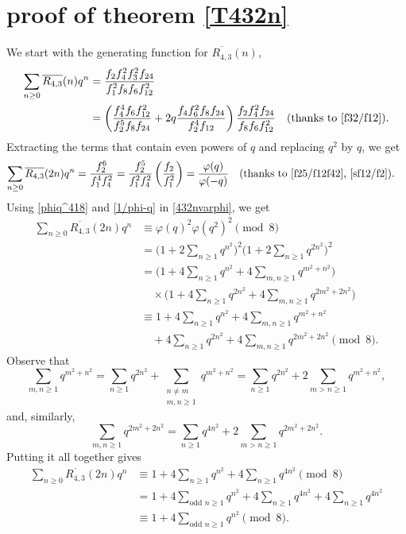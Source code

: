 \documentclass{amsart}
\theoremstyle{definition}
\begin{document}
\section{proof of theorem \ref{T432n}}
We start with the generating function for $\overline{R_{4,3}}(n)$,
\begin{align*}
\sum_{n\geq 0}\overline{R_{4,3}}(n)q^n&=\frac{f_2f_4^2f_3^2f_{24}}{f_1^2f_{8}f_{6}f_{12}^2}\\
&=\left(\frac{f_4^4f_6f_{12}^2}{f_2^5f_8f_{24}}+2q\frac{f_4f_6^2f_8f_{24}}{f_2^4f_{12}}\right)\frac{f_2f_4^2f_{24}}{f_{8}f_{6}f_{12}^2} \quad \text{(thanks to \eqref{f32/f12})}.
\end{align*}
Extracting the terms that contain even powers of $q$ and replacing $q^2$ by $q$, we get
\begin{align}
 \label{432nvarphi} \sum_{n\geq 0}\overline{R_{4,3}}(2n)q^n&=\frac{f_2^6}{f_1^4f_4^2}=\frac{f_2^5}{f_1^2f_4^2}\left(\frac{f_2}{f_1^2}\right)=\frac{\varphi(q)}{\varphi(-q)} \quad \text{(thanks to \eqref{f25/f12f42}, \eqref{sf12/f2})}.
 \end{align}
Using \eqref{phiq^418} and \eqref{1/phi-q} in \eqref{432nvarphi}, we get
 \begin{align*}
  \sum_{n\geq 0}\overline{R_{4,3}}(2n)q^n&\equiv \varphi(q)^2\varphi(q^2)^2\pmod{8} \quad\\
&=\Big(1+2\sum_{n\geq1}q^{n^2}\Big)^2\Big(1+2\sum_{n\geq1}q^{2n^2}\Big)^2\\
&=\Big(1+4\sum_{n\geq1}q^{n^2}+4\sum_{m,n\geq1}q^{m^2+n^2}\Big)\\
&\quad\times\Big(1+4\sum_{n\geq1}q^{2n^2}+4\sum_{m,n\geq1}q^{2m^2+2n^2}\Big)\\
   &\equiv 1+4\sum_{n\geq1}q^{n^2}+4\sum_{m,n\geq1}q^{m^2+n^2}\\
   &\quad+4\sum_{n\geq1}q^{2n^2}+4\sum_{m,n\geq1}q^{2m^2+2n^2}\pmod{8}.\end{align*}
Observe that 
$$
\sum_{m,n\geq1}q^{m^2+n^2}=\sum_{n\geq1}q^{2n^2}+\sum_{\substack{n\neq m\\m,n\geq1}}q^{m^2+n^2}=\sum_{n\geq1}q^{2n^2}+2\sum_{m>n\geq1}q^{m^2+n^2},$$
and, similarly,
$$\sum_{m,n\geq1}q^{2m^2+2n^2}= \sum_{n\geq1}q^{4n^2}+2\sum_{m>n\geq1}q^{2m^2+2n^2}.
$$
Putting it all together gives
\begin{align*}
   \sum_{n\geq 0}\overline{R_{4,3}}(2n)q^n&\equiv1+ 4\sum_{n\geq1}q^{n^2}+4\sum_{n\geq1}q^{4n^2} \pmod{8}\\
    &=1+ 4\sum_{\text{odd }n\geq1}q^{n^2}+ 4\sum_{n\geq1}q^{4n^2}+4\sum_{n\geq1}q^{4n^2}\\
   &\equiv1+ 4\sum_{\text{odd }n\geq1}q^{n^2}\pmod{8}.
\end{align*}
\end{document}
